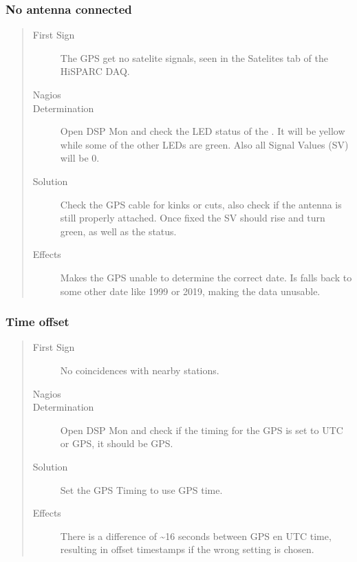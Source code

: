\documentclass[a4paper,11pt,english]{sphinxmanual}
\begin{document}
\subsubsection{No antenna connected}
\label{known-issues:no-antenna-connected}\begin{quote}\begin{description}
\item[{First Sign}] \leavevmode
The GPS get no satelite signals, seen in the Satelites tab
of the HiSPARC DAQ.

\item[{Nagios}] \leavevmode
\item[{Determination}] \leavevmode
Open DSP Mon and check the LED status of the
. It will be yellow while some of
the other LEDs are green. Also all Signal Values (SV)
will be 0.

\item[{Solution}] \leavevmode
Check the GPS cable for kinks or cuts, also check if the
antenna is still properly attached. Once fixed the SV should
rise and turn green, as well as the 
status.

\item[{Effects}] \leavevmode
Makes the GPS unable to determine the correct date. Is falls
back to some other date like 1999 or 2019, making the data
unusable.

\end{description}\end{quote}


\subsubsection{Time offset}
\label{known-issues:time-offset}\begin{quote}\begin{description}
\item[{First Sign}] \leavevmode
No coincidences with nearby stations.

\item[{Nagios}] \leavevmode
\item[{Determination}] \leavevmode
Open DSP Mon and check if the timing for the GPS is set
to UTC or GPS, it should be GPS.

\item[{Solution}] \leavevmode
Set the GPS Timing to use GPS time.

\item[{Effects}] \leavevmode
There is a difference of \textasciitilde{}16 seconds between GPS en UTC time,
resulting in offset timestamps if the wrong setting is chosen.

\end{description}\end{quote}
\end{document}
